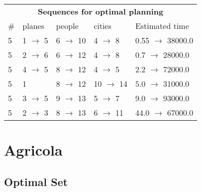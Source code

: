 \documentclass{article}
\begin{document}
                            \begin{center}
                            \begin{tabular}{l|l|l|l|l}
                            \multicolumn{5}{c}{\bf \large Sequences for optimal planning}\\
                            \# & planes & people & cities & Estimated time\\\midrule
                            5&1 $\rightarrow$ 5&6 $\rightarrow$ 10&4 $\rightarrow$ 8&0.55 $\rightarrow$ 38000.0\\
5&2 $\rightarrow$ 6&6 $\rightarrow$ 12&4 $\rightarrow$ 8&0.7 $\rightarrow$ 28000.0\\
5&4 $\rightarrow$ 5&8 $\rightarrow$ 12&4 $\rightarrow$ 5&2.2 $\rightarrow$ 72000.0\\
5&1&8 $\rightarrow$ 12&10 $\rightarrow$ 14&5.0 $\rightarrow$ 31000.0\\
5&3 $\rightarrow$ 5&9 $\rightarrow$ 13&5 $\rightarrow$ 7&9.0 $\rightarrow$ 93000.0\\
5&2 $\rightarrow$ 3&8 $\rightarrow$ 13&6 $\rightarrow$ 11&44.0 $\rightarrow$ 67000.0
                            \end{tabular}
                            \end{center}
                    \newpage \section{Agricola}
                    \subsection*{Optimal Set}
                    
\end{document}

